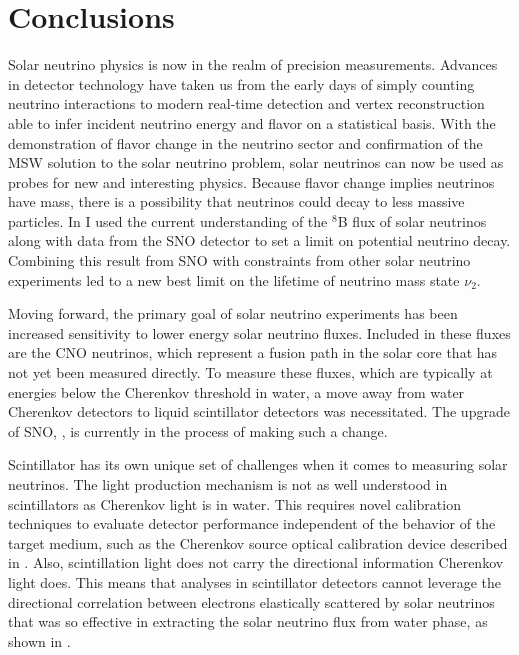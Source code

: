 \chapter{Conclusions}

Solar neutrino physics is now in the realm of precision measurements.
Advances in detector technology have taken us from the early days of simply counting neutrino interactions to modern real-time detection and vertex reconstruction able to infer incident neutrino energy and flavor on a statistical basis.
With the demonstration of flavor change in the neutrino sector and confirmation of the MSW solution to the solar neutrino problem, solar neutrinos can now be used as probes for new and interesting physics.
Because flavor change implies neutrinos have mass, there is a possibility that neutrinos could decay to less massive particles.
In  I used the current understanding of the $^8$B flux of solar neutrinos along with data from the SNO detector to set a limit on potential neutrino decay.
Combining this result from SNO with constraints from other solar neutrino experiments led to a new best limit on the lifetime of neutrino mass state $\nu_2$.

Moving forward, the primary goal of solar neutrino experiments has been increased sensitivity to lower energy solar neutrino fluxes.
Included in these fluxes are the CNO neutrinos, which represent a fusion path in the solar core that has not yet been measured directly.
To measure these fluxes, which are typically at energies below the Cherenkov threshold in water, a move away from water Cherenkov detectors to liquid scintillator detectors was necessitated.
The upgrade of SNO, {\snop}, is currently in the process of making such a change.

Scintillator has its own unique set of challenges when it comes to measuring solar neutrinos.
The light production mechanism is not as well understood in scintillators as Cherenkov light is in water.
This requires novel calibration techniques to evaluate detector performance independent of the behavior of the target medium, such as the Cherenkov source optical calibration device described in .
Also, scintillation light does not carry the directional information Cherenkov light does.
This means that analyses in scintillator detectors cannot leverage the directional correlation between electrons elastically scattered by solar neutrinos that was so effective in extracting the solar neutrino flux from {\snop} water phase, as shown in .


